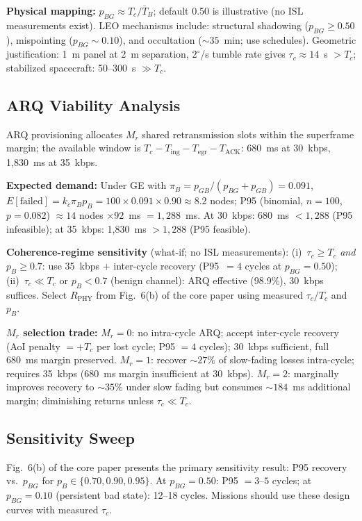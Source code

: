 \documentclass[journal]{IEEEtran}
\begin{document}
\textbf{Physical mapping:} $p_{BG} \approx T_c / \bar{T}_B$; default 0.50 is illustrative (no ISL measurements exist). LEO mechanisms include: structural shadowing ($p_{BG} \geq 0.50$), mispointing ($p_{BG} \sim 0.10$), and occultation (${\sim}35$~min; use schedules). Geometric justification: 1~m panel at 2~m separation, $2^\circ$/s tumble rate gives $\tau_c \approx 14$~s $> T_c$; stabilized spacecraft: 50--300~s $\gg T_c$.

\subsection{ARQ Viability Analysis}

ARQ provisioning allocates $M_r$ shared retransmission slots within the superframe margin; the available window is $T_c - T_{\text{ing}} - T_{\text{egr}} - T_{\text{ACK}}$: 680~ms at 30~kbps, 1,830~ms at 35~kbps.

\textbf{Expected demand:} Under GE with $\pi_B = p_{GB}/(p_{BG}+p_{GB}) = 0.091$, $E[\text{failed}] = k_c \pi_B p_B = 100 \times 0.091 \times 0.90 \approx 8.2$ nodes; P95 (binomial, $n\!=\!100$, $p\!=\!0.082$) $\approx 14$ nodes $\times 92$~ms $= 1{,}288$~ms. At 30~kbps: 680~ms $< 1{,}288$ (P95 infeasible); at 35~kbps: 1,830~ms $> 1{,}288$ (P95 feasible).

\textbf{Coherence-regime sensitivity} (what-if; no ISL measurements): (i)~$\tau_c \geq T_c$ \emph{and} $p_B \geq 0.7$: use 35~kbps $+$ inter-cycle recovery (P95~$= 4$ cycles at $p_{BG} = 0.50$); (ii)~$\tau_c \ll T_c$ or $p_B < 0.7$ (benign channel): ARQ effective (98.9\%), 30~kbps suffices. Select $R_{\text{PHY}}$ from Fig.~6(b) of the core paper using measured $\tau_c / T_c$ and $p_B$.

\textbf{$M_r$ selection trade:} $M_r = 0$: no intra-cycle ARQ; accept inter-cycle recovery (AoI penalty $= +T_c$ per lost cycle; P95 $= 4$ cycles); 30~kbps sufficient, full 680~ms margin preserved. $M_r = 1$: recover ${\sim}27\%$ of slow-fading losses intra-cycle; requires 35~kbps (680~ms margin insufficient at 30~kbps). $M_r = 2$: marginally improves recovery to ${\sim}35\%$ under slow fading but consumes ${\sim}184$~ms additional margin; diminishing returns unless $\tau_c \ll T_c$.

\subsection{Sensitivity Sweep}

Fig.~6(b) of the core paper presents the primary sensitivity result: P95 recovery vs.\ $p_{BG}$ for $p_B \in \{0.70, 0.90, 0.95\}$. At $p_{BG} = 0.50$: P95 $= 3$--$5$ cycles; at $p_{BG} = 0.10$ (persistent bad state): 12--18 cycles. Missions should use these design curves with measured $\tau_c$.
\end{document}
